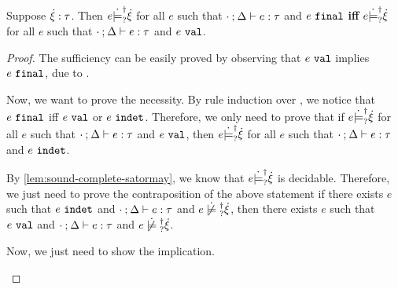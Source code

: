 \begin{lemma}
  \label{lem:val-final-satormay}
  Suppose $\dot{\xi} : \tau$. Then $e \dot{\models}_{?}^{\dag} \dot{\xi}$ for all $e$ such that $\cdot \mathbin{;} \Delta \vdash e : \tau$ and $e ~\mathtt{final}$ \textbf{iff} $e \dot{\models}_{?}^{\dag} \dot{\xi}$ for all $e$ such that $\cdot \mathbin{;} \Delta \vdash e : \tau$ and $e ~\mathtt{val}$.
\end{lemma}
\begin{proof}
  The sufficiency can be easily proved by observing that $e ~\mathtt{val}$ implies $e ~\mathtt{final}$, due to .
  
  Now, we want to prove the necessity. By rule induction over , we notice that $e ~\mathtt{final}$ iff $e ~\mathtt{val}$ or $e ~\mathtt{indet}$. Therefore, we only need to prove that if $e \dot{\models}_{?}^{\dag} \dot{\xi}$ for all $e$ such that $\cdot \mathbin{;} \Delta \vdash e : \tau$ and $e ~\mathtt{val}$, then $e \dot{\models}_{?}^{\dag} \dot{\xi}$ for all $e$ such that $\cdot \mathbin{;} \Delta \vdash e : \tau$ and $e ~\mathtt{indet}$.

  By \autoref{lem:sound-complete-satormay}, we know that $e \dot{\models}_{?}^{\dag} \dot{\xi}$ is decidable. Therefore, we just need to prove the contraposition of the above statement \textemdash if there exists $e$ such that $e ~\mathtt{indet}$ and $\cdot \mathbin{;} \Delta \vdash e : \tau$ and $\cnotsatisfyormay{e}{\hxi}$, then there exists $e$ such that $e ~\mathtt{val}$ and $\cdot \mathbin{;} \Delta \vdash e : \tau$ and $\cnotsatisfyormay{e}{\hxi}$.
  
  Now, we just need to show the implication.
  \begin{pfsteps}
  \item \ctyp{\hxi}{\tau}  
  \item {}  
  \item {}  
  \item {}  
  \item {}    
  \item {}  
  \item {} 
  \item {} 
  \item {} 
  \end{pfsteps}
  \resetpfcounter
\end{proof}

